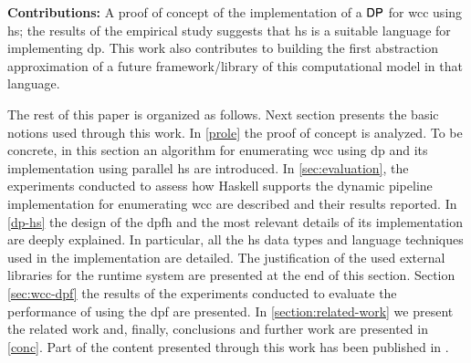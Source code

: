 \textbf{Contributions:} A proof of concept of the implementation of a $\mathsf{DP}$ for \acrshort{wcc} using \acrshort{hs}; the results of the empirical study suggests that   \acrshort{hs} is a suitable language for implementing \acrshort{dp}. This work also contributes to building the first abstraction approximation of a future framework/library of this computational model in that language. 

The rest of this paper is organized as follows. 
Next section  presents  the basic notions used through this work. 
In \autoref{prole}  the proof of concept is analyzed. To be concrete, in this section an algorithm for enumerating \acrshort{wcc} using \acrshort{dp} and its implementation using parallel \acrshort{hs} are introduced. 
In \autoref{sec:evaluation}, the experiments conducted to assess how  Haskell supports the dynamic pipeline implementation for enumerating \acrshort{wcc} are described and their results reported. 
In \autoref{dp-hs} the design of the \acrlong{dpfh} and the most relevant details of its implementation are deeply explained. In particular, all the \acrshort{hs} data types and language techniques used in the implementation are detailed. 
The justification of the used  external libraries for the runtime system are presented at the end of this section. Section \ref{sec:wcc-dpf} the results of the experiments conducted to evaluate the performance of  using the \acrshort{dpf} are presented.
In \ref{section:related-work} we present the related work and, finally, conclusions and further work are presented in  \autoref{conc}. 
Part of the content presented through this work has been published in \cite{prole}. 
